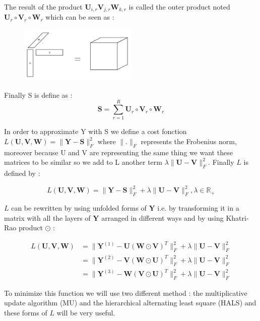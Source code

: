 \documentclass{article}
\begin{document}
The result of the product $\mathbf{U}_{i,r}\mathbf{V}_{j,r}\mathbf{W}_{k, r}$ is called the outer product noted $\mathbf{U}_r \circ \mathbf{V}_r \circ \mathbf{W}_r$ which can be seen as :

\begin{figure}[H]
    \centering
    \includegraphics[width=0.5\textwidth]{images/outer_product.png}
\end{figure}


Finally S is define as : 
\[
    \mathbf{S} = \sum_{r = 1}^R \mathbf{U}_r \circ \mathbf{V}_r \circ \mathbf{W}_r
\]

In order to approximate Y with S we define a cost fonction $L(\mathbf{U}, \mathbf{V}, \mathbf{W})=\|\mathbf{Y}-\mathbf{S}\|_{F}^2$ where $\|.\|_F$ represents the Frobenius norm,
moreover because U and V are representing the same thing we want these matrices to be similar so we add to L another term $\lambda\|\mathbf{U}-\mathbf{V}\|_{F}^2$.
 Finally $L$ is defined by :

\[
    L(\mathbf{U}, \mathbf{V}, \mathbf{W})=\|\mathbf{Y}-\mathbf{S}\|_{F}^2 +\lambda \|\mathbf{U}-\mathbf{V}\|_{F}^2, \lambda \in \mathbb{R}_+
\]

$L$ can be rewritten by using unfolded forms of $\mathbf{Y}$ i.e. by transforming it in a matrix with all the layers of $\mathbf{Y}$
arranged in different ways and by using Khatri-Rao product $\odot$ :

\begin{align*}
L(\mathbf{U}, \mathbf{V}, \mathbf{W}) &= \|\mathbf{Y}^{(1)}-\mathbf{U}(\mathbf{W}\odot \mathbf{V})^{T}\|_{F}^2 +\lambda \|\mathbf{U}-\mathbf{V}\|_{F}^2 \\
                &= \|\mathbf{Y}^{(2)}-\mathbf{V}(\mathbf{W}\odot \mathbf{U})^{T}\|_{F}^2 +\lambda \|\mathbf{U}-\mathbf{V}\|_{F}^2\\
                &= \|\mathbf{Y}^{(3)}-\mathbf{W}(\mathbf{V}\odot \mathbf{U})^{T}\|_{F}^2 +\lambda \|\mathbf{U}-\mathbf{V}\|_{F}^2
\end{align*}

To minimize this function we will use two
different method : the multiplicative update algorithm (MU) and the hierarchical alternating least square (HALS) and these forms of
$L$ will be very useful.
\end{document}
